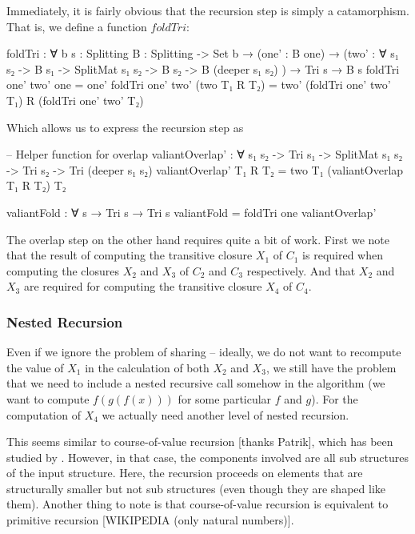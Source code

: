 \documentclass{article}
\begin{document}
Immediately, it is fairly obvious that the recursion step is simply a catamorphism. That is, we define a function $foldTri$:

\begin{code}
foldTri : ∀ {b} {s : Splitting} {B : Splitting -> Set b} → (one' : B one) → (two' : ∀ {s₁ s₂} -> B s₁ -> SplitMat s₁ s₂ -> B s₂ -> B (deeper s₁ s₂) ) → Tri s → B s
foldTri one' two' one = one'
foldTri one' two' (two T₁ R T₂) = two' (foldTri one' two' T₁) R (foldTri one' two' T₂)
\end{code}

Which allows us to express the recursion step as 

\begin{code}
-- Helper function for overlap
valiantOverlap' : ∀ {s₁ s₂} -> Tri s₁ -> SplitMat s₁ s₂ -> Tri s₂ -> Tri (deeper s₁ s₂)
valiantOverlap' T₁ R T₂ = two T₁ (valiantOverlap T₁ R T₂) T₂

valiantFold : ∀ {s} → Tri s → Tri s
valiantFold = foldTri one valiantOverlap'
\end{code}

The overlap step on the other hand requires quite a bit of work. 
First we note that the result of computing the transitive closure $X_1$ of $C_1$ is required when computing the closures $X_2$ and $X_3$ of $C_2$ and $C_3$ respectively. And that $X_2$ and $X_3$ are required for computing the transitive closure $X_4$ of $C_4$.

\subsubsection{Nested Recursion}
Even if we ignore the problem of sharing -- ideally, we do not want to recompute the value of $X_1$ in the calculation of both $X_2$ and $X_3$, we still have the problem that we need to include a nested recursive call somehow in the algorithm (we want to compute $f (g(f(x)))$ for some particular $f$ and $g$). For the computation of $X_4$ we actually need another level of nested recursion.

This seems similar to course-of-value recursion [thanks Patrik], which has been studied by \cite{histomorphism1}. However, in that case, the components involved are all sub structures of the input structure. Here, the recursion proceeds on elements that are structurally smaller but not sub structures (even though they are shaped like them). Another thing to note is that course-of-value recursion is equivalent to primitive recursion [WIKIPEDIA (only natural numbers)].
\end{document}
